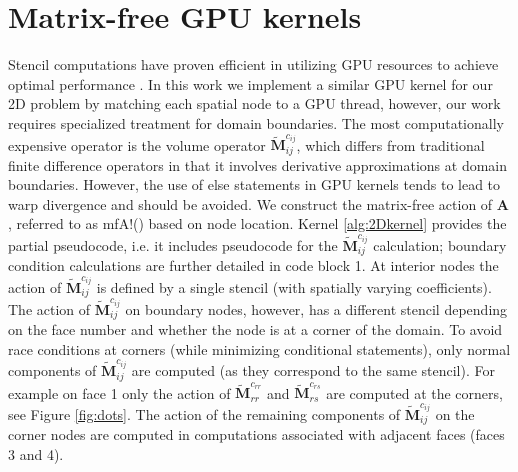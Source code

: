 \section{Matrix-free GPU kernels}
Stencil computations have proven efficient in utilizing GPU resources to achieve optimal performance \cite{vizitiu2014optimized,krotkiewski2013efficient}. In this work we implement a similar GPU kernel for our 2D problem by matching each spatial node to a GPU thread, however, our work requires specialized treatment for domain boundaries. The most computationally expensive operator is the volume operator $\tilde{\boldsymbol{M}}^{c_{ij}}_{ij}$, which differs from traditional finite difference operators in that it involves derivative approximations at domain boundaries. However, the use of else statements in GPU kernels tends to lead to warp divergence and should be avoided. We construct the matrix-free action of $\boldsymbol{A}$, referred to as {\ttfamily mfA!}() based on node location. Kernel \ref{alg:2Dkernel} provides the partial pseudocode, i.e. it includes pseudocode for the $\tilde{\boldsymbol{M}}^{c_{ij}}_{ij}$ calculation; boundary condition calculations are further detailed in code block 1.  At interior nodes the action of $\tilde{\boldsymbol{M}}^{c_{ij}}_{ij}$ is defined by a single stencil (with spatially varying coefficients). The action of $\tilde{\boldsymbol{M}}^{c_{ij}}_{ij}$ on boundary nodes, however, has a different stencil depending on the face number and whether the node is at a corner of the domain. To avoid race conditions at corners (while minimizing conditional statements), only normal components of $\tilde{\boldsymbol{M}}^{c_{ij}}_{ij}$ are computed (as they correspond to the same stencil). For example on face 1 only the action of $\tilde{\boldsymbol{M}}^{c_{rr}}_{rr}$ and $\tilde{\boldsymbol{M}}^{c_{rs}}_{rs}$ are computed at the corners, see Figure \ref{fig:dots}. The action of the remaining components of $\tilde{\boldsymbol{M}}^{c_{ij}}_{ij}$ on the corner nodes are computed in computations associated with adjacent faces (faces 3 and 4). 

